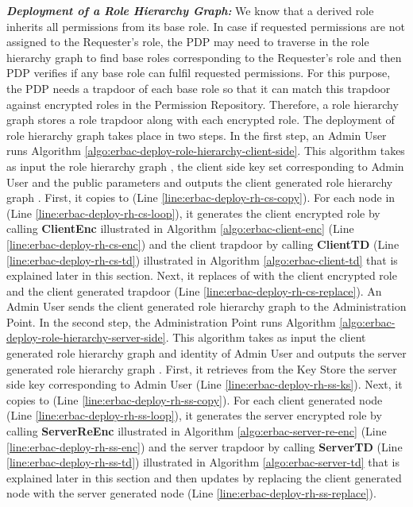 \documentclass[epsfig,a4paper,11pt,titlepage]{book}
\numberwithin{algorithm}{chapter}
\begin{document}
\noindent \emph{\textbf{Deployment of a Role Hierarchy Graph:}} 
We know that a derived role inherits all permissions from its base role. In case if requested permissions are not assigned to the Requester's role, the \gls{PDP} may need to traverse in the role hierarchy graph to find base roles corresponding to the Requester's role and then \gls{PDP} verifies if any base role can fulfil requested permissions. For this purpose, the \gls{PDP} needs a trapdoor of each base role so that it can match this trapdoor against encrypted roles in the Permission Repository. Therefore, a role hierarchy graph stores a role trapdoor along with each encrypted role. The deployment of role hierarchy graph takes place in two steps. In the first step, an Admin User runs Algorithm \ref{algo:erbac-deploy-role-hierarchy-client-side}. This algorithm takes as input the role hierarchy graph , the client side key set  corresponding to Admin User  and the public parameters  and outputs the client generated role hierarchy graph . First, it copies  to   (Line \ref{line:erbac-deploy-rh-cs-copy}). For each node  in  (Line \ref{line:erbac-deploy-rh-cs-loop}), it generates the client encrypted role by calling \textbf{ClientEnc} illustrated in Algorithm \ref{algo:erbac-client-enc} (Line \ref{line:erbac-deploy-rh-cs-enc}) and the client trapdoor by calling \textbf{ClientTD} (Line \ref{line:erbac-deploy-rh-cs-td}) illustrated in Algorithm \ref{algo:erbac-client-td} that is explained later in this section. Next, it replaces  of  with the client encrypted role and the client generated trapdoor (Line \ref{line:erbac-deploy-rh-cs-replace}). An Admin User sends the client generated role hierarchy graph to the Administration Point. 
In the second step, the Administration Point runs Algorithm \ref{algo:erbac-deploy-role-hierarchy-server-side}. This algorithm takes as input the client generated role hierarchy graph  and identity of Admin User  and outputs the server generated role hierarchy graph . First, it retrieves from the Key Store the server side key  corresponding to Admin User  (Line \ref{line:erbac-deploy-rh-ss-ks}). Next, it copies  to  (Line \ref{line:erbac-deploy-rh-ss-copy}). For each client generated node (Line \ref{line:erbac-deploy-rh-ss-loop}), it generates the server encrypted role by calling \textbf{ServerReEnc} illustrated in Algorithm \ref{algo:erbac-server-re-enc} (Line \ref{line:erbac-deploy-rh-ss-enc}) and the server trapdoor by calling \textbf{ServerTD} (Line \ref{line:erbac-deploy-rh-ss-td}) illustrated in Algorithm \ref{algo:erbac-server-td} that is explained later in this section and then updates  by replacing the client generated node with the server generated node (Line \ref{line:erbac-deploy-rh-ss-replace}). 
\end{document}
